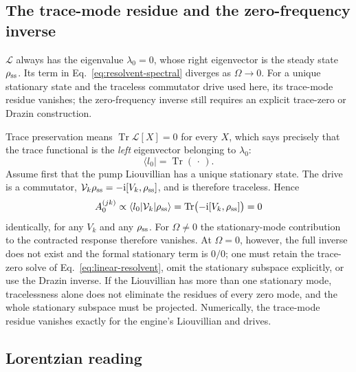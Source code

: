 \documentclass[11pt,a4paper]{article}
\newcommand{\ii}{\mathrm i}
\newcommand{\Tr}{\operatorname{Tr}}
\newcommand{\ket}[1]{\lvert #1\rangle}
\newcommand{\bra}[1]{\langle #1\rvert}
\begin{document}
\subsection{The trace-mode residue and the zero-frequency inverse}
\label{sec:zero-pole}

$\mathcal L$ always has the eigenvalue $\lambda_0=0$, whose right
eigenvector is the steady state $\rho_{\rm ss}$. Its term in
Eq.~\eqref{eq:resolvent-spectral} diverges as $\Omega\to0$. For a unique
stationary state and the traceless commutator drive used here, its trace-mode
residue vanishes; the zero-frequency inverse still requires an explicit
trace-zero or Drazin construction.

Trace preservation means $\Tr\mathcal L[X]=0$ for every $X$, which says
precisely that the trace functional is the \emph{left} eigenvector belonging
to $\lambda_0$:
\begin{equation}
\bra{l_0}=\Tr(\,\cdot\,).
\label{eq:left-null}
\end{equation}
Assume first that the pump Liouvillian has a unique stationary state. The drive
is a commutator, $\mathcal V_k\rho_{\rm ss}=-\ii[V_k,\rho_{\rm ss}]$, and is
therefore traceless. Hence
\begin{equation}
A^{(jk)}_0\propto\bra{l_0}\mathcal V_k\ket{\rho_{\rm ss}}
=\Tr\bigl(-\ii[V_k,\rho_{\rm ss}]\bigr)=0
\label{eq:zero-residue}
\end{equation}
identically, for any $V_k$ and any $\rho_{\rm ss}$. For $\Omega\ne0$ the
stationary-mode contribution to the contracted response therefore vanishes.
At $\Omega=0$, however, the full inverse does not exist and the formal
stationary term is $0/0$; one must retain the trace-zero solve of
Eq.~\eqref{eq:linear-resolvent}, omit the stationary subspace explicitly, or use
the Drazin inverse. If the Liouvillian has more than one stationary mode,
tracelessness alone does not eliminate the residues of every zero mode, and the
whole stationary subspace must be projected. Numerically, the trace-mode
residue vanishes exactly for the engine's Liouvillian and drives.

\subsection{Lorentzian reading}
\end{document}
